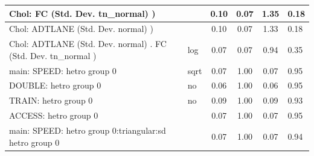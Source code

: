 \begin{table}
\begin{center}
\begin{tabular}{|l|l|c|c|c|l|}
			\hline
			 Chol: FC (Std. Dev. tn_normal) ) &  & 0.10 & 0.07 & 1.35 & 0.18 \\
			\hline
			 Chol: ADTLANE (Std. Dev. normal) ) &  & 0.10 & 0.07 & 1.33 & 0.18 \\
			\hline
			 Chol: ADTLANE (Std. Dev. normal) . FC (Std. Dev.   tn_normal ) & log & 0.07 & 0.07 & 0.94 & 0.35 \\
			\hline
			main: SPEED: hetro group 0 & sqrt & 0.07 & 1.00 & 0.07 & 0.95 \\
			\hline
			DOUBLE: hetro group 0 & no & 0.06 & 1.00 & 0.06 & 0.95 \\
			\hline
			TRAIN: hetro group 0 & no & 0.09 & 1.00 & 0.09 & 0.93 \\
			\hline
			ACCESS: hetro group 0 &  & 0.07 & 1.00 & 0.07 & 0.95 \\
			\hline
			main: SPEED: hetro group 0:triangular:sd  hetro group 0 &  & 0.07 & 1.00 & 0.07 & 0.94 \\
			\hline
		\end{tabular}
	\end{center}
\end{table}